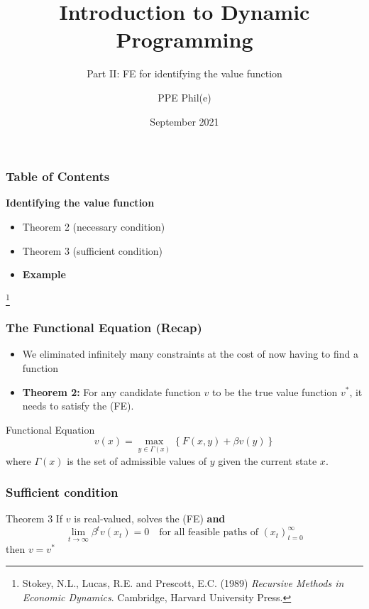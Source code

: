 \documentclass[aspectratio=169]{beamer}
\title[Dynamic Programming Part II] %
{Introduction to Dynamic Programming}
\subtitle{Part II: FE for identifying the value function}
\author[PPE Phil(e)]
{PPE Phil(e)\inst{1}}
\institute[] %
{
  \inst{1}%
  material @ https://github.com/PPEphile
}
\date[2021] %
{September 2021}
\newcommand\blfootnote[1]{%
\begingroup
\renewcommand\thefootnote{}\footnote{#1}%
\addtocounter{footnote}{-1}%
\endgroup
}
\begin{document}
\frame{\titlepage}

\begin{frame}
\frametitle{Table of Contents}
\textbf{Identifying the \color{magenta} value function} \color{black} 
\begin{itemize}
\item Theorem 2 (necessary condition)
\item Theorem 3 (sufficient condition)
\item \textbf{Example}
\end{itemize}

\blfootnote{Stokey, N.L., Lucas, R.E. and Prescott, E.C. (1989) \textit{Recursive Methods in Economic Dynamics}. Cambridge, Harvard University Press.}

\end{frame}

\begin{frame}
\frametitle{The Functional Equation (Recap)}
\begin{itemize}
\item We eliminated infinitely many constraints at the cost of now having to find a function
\item \textbf{Theorem 2:} For any candidate function $v$ to be the true value function $v^*$, it needs to satisfy the (FE).
\end{itemize}
\begin{block}{Functional Equation}
\begin{equation}
v(x) = \max_{y \in \Gamma(x)} \left\lbrace F(x, y) + \beta v(y) \right\rbrace \tag{FE}
\end{equation}
where $\Gamma(x)$ is the set of admissible values of $y$ given the current state $x$.
\end{block}

\end{frame}

\begin{frame}
\frametitle{Sufficient condition}
\begin{block}{Theorem 3}
If $v$ is real-valued, solves the (FE) \textbf{and}
\begin{equation*}
\lim_{t \to \infty} \beta^{t}v(x_{t}) = 0 \quad \textrm{for all feasible paths of } (x_t)^{\infty}_{t=0}
\end{equation*}
then $v = v^*$
\end{block}
\end{frame}
\end{document}
